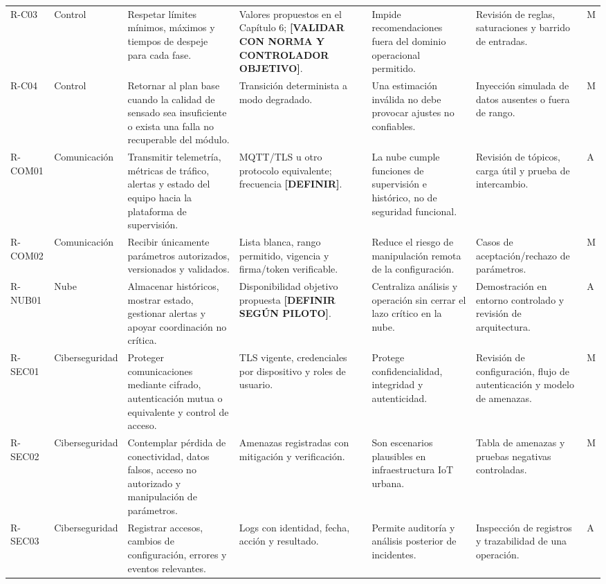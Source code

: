 \documentclass[12pt,a4paper,oneside]{report}
\begin{document}
\begin{landscape}
\begin{longtable}{@{}p{1.15cm}p{1.65cm}p{5.25cm}p{3.15cm}p{4.35cm}p{3.65cm}p{1.25cm}@{}}
R-C03 & Control & Respetar límites mínimos, máximos y tiempos de despeje para cada fase. & Valores propuestos en el Capítulo 6; \textbf{[VALIDAR CON NORMA Y CONTROLADOR OBJETIVO]}. & Impide recomendaciones fuera del dominio operacional permitido. & Revisión de reglas, saturaciones y barrido de entradas. & M\\
R-C04 & Control & Retornar al plan base cuando la calidad de sensado sea insuficiente o exista una falla no recuperable del módulo. & Transición determinista a modo degradado. & Una estimación inválida no debe provocar ajustes no confiables. & Inyección simulada de datos ausentes o fuera de rango. & M\\
R-COM01 & Comunicación & Transmitir telemetría, métricas de tráfico, alertas y estado del equipo hacia la plataforma de supervisión. & MQTT/TLS u otro protocolo equivalente; frecuencia \textbf{[DEFINIR]}. & La nube cumple funciones de supervisión e histórico, no de seguridad funcional. & Revisión de tópicos, carga útil y prueba de intercambio. & A\\
R-COM02 & Comunicación & Recibir únicamente parámetros autorizados, versionados y validados. & Lista blanca, rango permitido, vigencia y firma/token verificable. & Reduce el riesgo de manipulación remota de la configuración. & Casos de aceptación/rechazo de parámetros. & M\\
R-NUB01 & Nube & Almacenar históricos, mostrar estado, gestionar alertas y apoyar coordinación no crítica. & Disponibilidad objetivo propuesta \textbf{[DEFINIR SEGÚN PILOTO]}. & Centraliza análisis y operación sin cerrar el lazo crítico en la nube. & Demostración en entorno controlado y revisión de arquitectura. & A\\
R-SEC01 & Ciberseguridad & Proteger comunicaciones mediante cifrado, autenticación mutua o equivalente y control de acceso. & TLS vigente, credenciales por dispositivo y roles de usuario. & Protege confidencialidad, integridad y autenticidad. & Revisión de configuración, flujo de autenticación y modelo de amenazas. & M\\
R-SEC02 & Ciberseguridad & Contemplar pérdida de conectividad, datos falsos, acceso no autorizado y manipulación de parámetros. & Amenazas registradas con mitigación y verificación. & Son escenarios plausibles en infraestructura IoT urbana. & Tabla de amenazas y pruebas negativas controladas. & M\\
R-SEC03 & Ciberseguridad & Registrar accesos, cambios de configuración, errores y eventos relevantes. & Logs con identidad, fecha, acción y resultado. & Permite auditoría y análisis posterior de incidentes. & Inspección de registros y trazabilidad de una operación. & A\\

\end{longtable}
\end{landscape}
\end{document}
